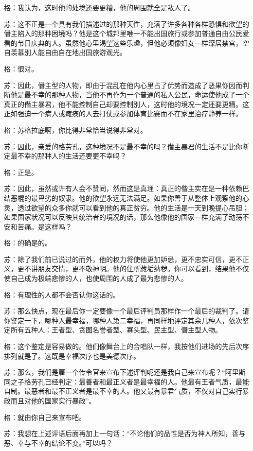 \documentclass[12pt,oneside]{book}
\begin{document}
格：我认为，这时他的处境还要更糟，他的周围就全是敌人了。

苏：这不正是一个具有我们描述过的那种天性，充满了许多各种各样恐惧和欲望的僭主陷入的那种困境吗？他是这个城邦里唯一不能出国旅行或参加普通自由公民爱看的节日庆典的人。虽然他心里渴望这些乐趣，但他必须像妇女一样深居禁宫，空自羡慕别人能自由自在地出国旅游观光。

格：很对。

苏：因此，僭主型的人物，即由于混乱在他内心里占了优势而造成了恶果你因而判断他是最不幸的那种人物，当他不再作为一个普通的私人公民，命运使他成了一个真正的僭主暴君，他不能控制自己却要控制别人，这时他的境况一定还要更糟。这正如强迫一个病人或瘫痪的人去打仗或参加体育比赛而不在家里治疗静养一样。

格：苏格拉底啊，你比得非常恰当说得非常对。

苏：因此，亲爱的格劳孔，这种境况不是最不幸的吗？僭主暴君的生活不是比你断定最不幸的那种人的生活还要更不幸吗？

格：正是。

苏：因此，虽然或许有人会不赞同，然而这是真理：真正的偕主实在是一种依赖巴结恶棍的最卑劣的奴隶。他的欲望永远无法满足。如果你善于从整体上观察他的心灵，透过欲望的众多你就可以看到他的真正贫穷。他的生活是一天到晚提心吊胆；如果国家状况可以反映其统治者的境况的话，那么他像他的国家一样充满了动荡不安和苦痛。是这样吗？

格：的确是的。

苏：除了我们前已说过的而外，他的权力将使他更加妒忌，更不忠实可信，更不正义，更不讲朋友交情，更不敬神明。他的住所藏垢纳秽。你可以看到，结果他不仅使自己成为极端悲惨的人，也使周围的人成了最为悲惨的人。

格：有理性的人都不会否认你这话的。

苏：那么快点，现在最后你一定要像一个最后评判员那样作一个最后的裁判了。请你鉴定一下，哪种人最幸福，哪种人第二幸福，再同样地评定其余几种人，依次鉴定所有五种人：王者型、贪图名誉者型、寡头型、民主型、僭主型人物。

格：这个鉴定是容易做的。他们像舞台上的合唱队一样，我按他们进场的先后次序排列就是了。这既是幸福次序也是美德次序。

苏：那么，我们是雇一个传令官来宣布下述评判呢还是我自己来宣布呢？“阿里斯同之子格劳孔已经判定：最善者和最正义者是最幸福的人。他最有王者气质，最能自制。最恶者和最不正义者是最不幸的人。他又最有暴君气质，不仅对自己实行暴政而且对他的国家实行暴政”。

格：就由你自己来宣布吧。

苏：我想在上述评语后面再加上一句话：“不论他们的品性是否为神人所知，善与恶、幸与不幸的结论不变。”可以吗？
\end{document}
